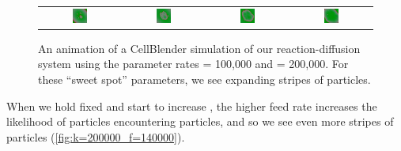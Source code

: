 \begin{figure}[h]
\begin{tabular}{c c c c}
\includegraphics[width = 0.2\textwidth]{../images/predator_prey_11_by_11_f_1_k_2_i4.png} & \includegraphics[width = 0.2\textwidth]{../images/../images/predator_prey_11_by_11_f_1_k_2_i5.png} & \includegraphics[width = 0.2\textwidth]{../images/../images/predator_prey_11_by_11_f_1_k_2_i6.png} & \includegraphics[width = 0.2\textwidth]{../images/../images/predator_prey_11_by_11_f_1_k_2_i7.png}
\end{tabular}
\caption{An animation of a CellBlender simulation of our reaction-diffusion system using the parameter rates  = 100,000 and  = 200,000. For these ``sweet spot'' parameters, we see expanding stripes of  particles.}
\label{fig:k=200000_f=100000}
\end{figure}

When we hold  fixed and start to increase , the higher feed rate increases the likelihood of  particles encountering  particles, and so we see even more stripes of  particles (\autoref{fig:k=200000_f=140000}).

